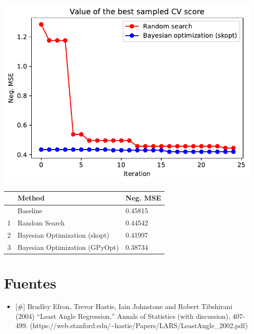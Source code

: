 \documentclass[
  12pt,
  letterpaper,
  DIV=11,
  numbers=noendperiod]{scrartcl}
\providecommand{\tightlist}{%
  \setlength{\itemsep}{0pt}\setlength{\parskip}{0pt}}\usepackage{longtable,booktabs,array}
\begin{document}
\includegraphics{ProyFinal_OptBayesiana_2024_files/figure-pdf/cell-24-output-1.pdf}

\begin{longtable}[]{@{}lll@{}}
\toprule\noalign{}
& Method & Neg. MSE \\
\midrule\noalign{}
\endhead
\bottomrule\noalign{}
\endlastfoot
0 & Baseline & 0.45815 \\
1 & Random Search & 0.44542 \\
2 & Bayesian Optimization (skopt) & 0.41997 \\
3 & Bayesian Optimization (GPyOpt) & 0.38734 \\
\end{longtable}

\section{Fuentes}\label{fuentes}

\begin{itemize}
\tightlist
\item
  {[}\#{]} Bradley Efron, Trevor Hastie, Iain Johnstone and Robert
  Tibshirani (2004) ``Least Angle Regression,'' Annals of Statistics
  (with discussion), 407-499.
  (https://web.stanford.edu/\textasciitilde hastie/Papers/LARS/LeastAngle\_2002.pdf)
\end{itemize}
\end{document}

